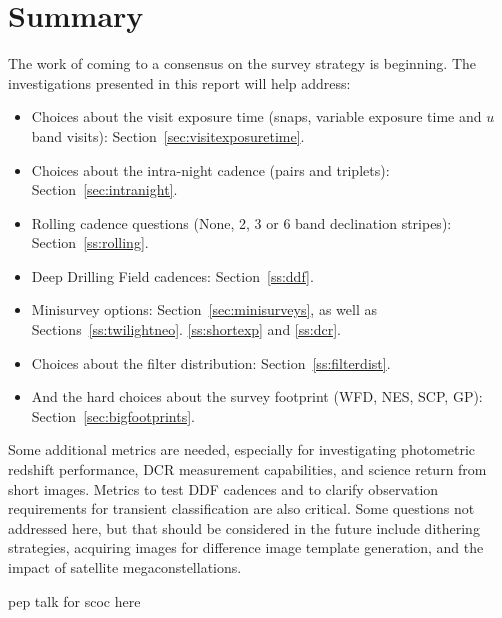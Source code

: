 \section{Summary}

The work of coming to a consensus on the survey strategy is beginning. The investigations presented in this report will help address:
\begin{itemize}
\item Choices about the visit exposure time (snaps, variable exposure time and $u$ band visits): Section~\ref{sec:visitexposuretime}.
\item Choices about the intra-night cadence (pairs and triplets): Section~\ref{sec:intranight}.
\item Rolling cadence questions (None, 2, 3 or 6 band declination stripes): Section~\ref{ss:rolling}.
\item Deep Drilling Field cadences: Section~\ref{ss:ddf}.
\item Minisurvey options: Section~\ref{sec:minisurveys}, as well as Sections~\ref{ss:twilightneo}. \ref{ss:shortexp} and \ref{ss:dcr}.
\item Choices about the filter distribution: Section~\ref{ss:filterdist}.
\item And the hard choices about the survey footprint (WFD, NES, SCP, GP): Section~\ref{sec:bigfootprints}.
\end{itemize}
Some additional metrics are needed, especially for investigating photometric redshift performance, DCR measurement capabilities, and science return from short images. Metrics to test DDF cadences and to clarify observation requirements for transient classification are also critical. Some questions not addressed here, but that should be considered in the future include dithering strategies, acquiring images for difference image template generation, and the impact of satellite megaconstellations. 

pep talk for scoc here 